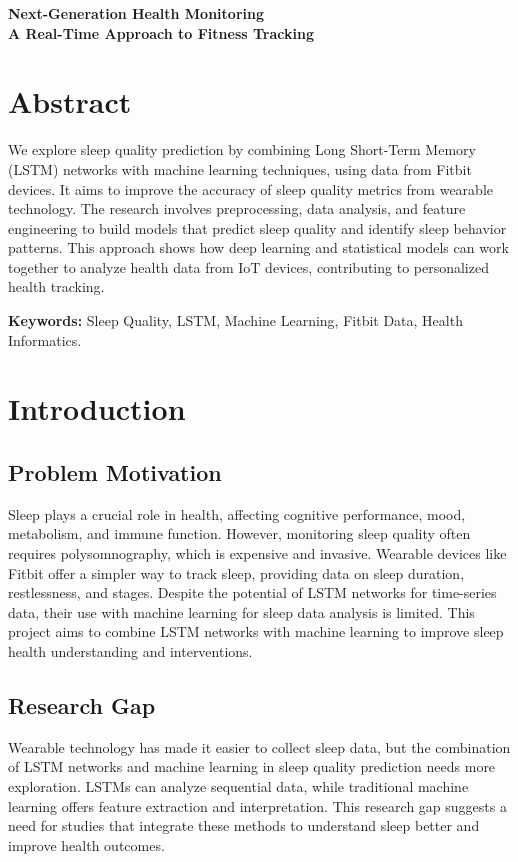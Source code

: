 \documentclass[10pt]{extarticle}
\begin{document}
\begin{center}
    {\LARGE \textbf{Next-Generation Health Monitoring}} \\
    {\large \textbf{A Real-Time Approach to Fitness Tracking}}
\end{center}

\section{Abstract}

We explore sleep quality prediction by combining Long Short-Term Memory (LSTM) networks with machine learning techniques, using data from Fitbit devices. It aims to improve the accuracy of sleep quality metrics from wearable technology. The research involves preprocessing, data analysis, and feature engineering to build models that predict sleep quality and identify sleep behavior patterns. This approach shows how deep learning and statistical models can work together to analyze health data from IoT devices, contributing to personalized health tracking.

\textbf{Keywords:} Sleep Quality, LSTM, Machine Learning, Fitbit Data, Health Informatics.

\section{Introduction}

\subsection{Problem Motivation}

Sleep plays a crucial role in health, affecting cognitive performance, mood, metabolism, and immune function. However, monitoring sleep quality often requires polysomnography, which is expensive and invasive. Wearable devices like Fitbit offer a simpler way to track sleep, providing data on sleep duration, restlessness, and stages. Despite the potential of LSTM networks for time-series data, their use with machine learning for sleep data analysis is limited. This project aims to combine LSTM networks with machine learning to improve sleep health understanding and interventions.

\subsection{Research Gap}

Wearable technology has made it easier to collect sleep data, but the combination of LSTM networks and machine learning in sleep quality prediction needs more exploration. LSTMs can analyze sequential data, while traditional machine learning offers feature extraction and interpretation. This research gap suggests a need for studies that integrate these methods to understand sleep better and improve health outcomes.
\end{document}
